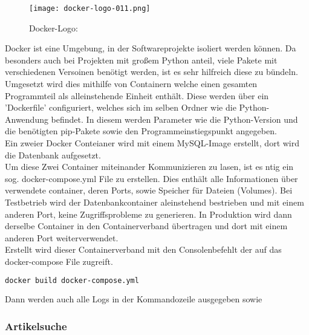     \begin{wrapfigure}{r}{0.3\textwidth} %
        \vspace{-20px}
        \texttt{[image: docker-logo-011.png]} %
        \caption{Docker-Logo: \cite{docker_logo}}
    \end{wrapfigure}

    Docker ist eine Umgebung, in der Softwareprojekte isoliert werden können. Da besonders auch bei Projekten mit großem Python anteil, viele Pakete mit verschiedenen Versoinen benötigt werden, ist es sehr hilfreich diese zu bündeln. \\
    Umgesetzt wird dies mithilfe von Containern welche einen gesamten Programmteil als alleinstehende Einheit enthält. Diese werden über ein 'Dockerfile' configuriert, welches sich im selben Ordner wie die Python-Anwendung befindet. In diesem werden Parameter wie die Python-Version und die benötigten pip-Pakete sowie den Programmeinstiegspunkt angegeben. \\ 
    Ein zweier Docker Conteianer wird mit einem MySQL-Image erstellt, dort wird die Datenbank aufgesetzt. \\
    Um diese Zwei Container miteinander Kommunizieren zu lasen, ist es ntig ein sog. docker-compose.yml File zu erstellen. Dies enthält alle Informationen über verwendete container, deren Ports, sowie Speicher für Dateien (Volumes). Bei Testbetrieb wird der Datenbankcontainer aleinstehend bestrieben und mit einem anderen Port, keine Zugriffsprobleme zu generieren. In Produktion wird dann derselbe Container in den Containerverband übertragen und dort mit einem anderen Port weiterverwendet. \\
    Erstellt wird dieser Containerverband mit den Consolenbefehlt der auf das docker-compose File zugreift. 
    \begin{lstlisting}[language=bash]
        docker build docker-compose.yml\end{lstlisting}
    Dann werden auch alle Logs in der Kommandozeile ausgegeben sowie 


\subsubsection{Artikelsuche}
